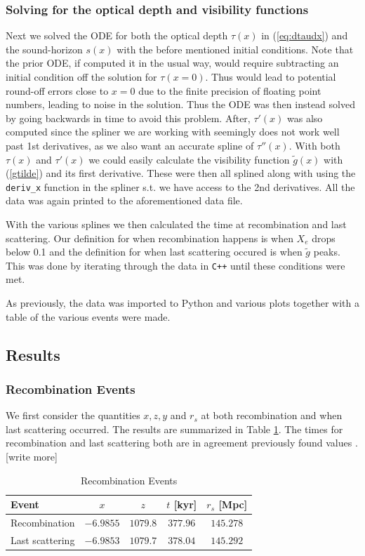 \documentclass[%
reprint,
 amsmath,amssymb,
 aps,
]{revtex4-2}
\begin{document}
\subsubsection{Solving for the optical depth and visibility functions}
Next we solved the ODE for both the optical depth $\tau(x)$ in (\ref{eq:dtaudx}) and the sound-horizon $s(x)$ with the before mentioned initial conditions. Note that the prior ODE, if computed it in the usual way, would require subtracting an initial condition off the solution for $\tau(x=0)$. Thus would lead to potential round-off errors close to $x=0$ due to the finite precision of floating point numbers, leading to noise in the solution. Thus the ODE was then instead solved by going backwards in time to avoid this problem. After, $\tau'(x)$ was also computed since the spliner we are working with seemingly does not work well past 1st derivatives, as we also want an accurate spline of $\tau''(x)$. With both $\tau(x)$ and $\tau'(x)$ we could easily calculate the visibility function $\tilde g(x)$ with (\ref{gtilde}) and its first derivative. These were then all splined along with using the \texttt{deriv\_x} function in the spliner s.t. we have access to the 2nd derivatives. All the data was again printed to the aforementioned data file.

With the various splines we then calculated the time at recombination and last scattering. Our definition for when recombination happens is when $X_e$ drops below 0.1 and the definition for when last scattering occured is when $\tilde g$ peaks. This was done by iterating through the data in \texttt{C++} until these conditions were met.

As previously, the data was imported to Python and various plots together with a table of the various events were made.

\subsection{Results}
\subsubsection{Recombination Events}
We first consider the quantities $x,z,y$ and $r_s$ at both recombination and when last scattering occurred. The results are summarized in Table \ref{tab:recombination_events}. The times for recombination and last scattering both are in agreement previously found values \cite{Planck:2018vyg}. \color{red}[write more]\color{black}
\renewcommand{\arraystretch}{1.25}
\begin{table}[ht!]
	\caption{Recombination Events}
	\label{tab:recombination_events}
	\begin{tabular}{|l|c|c|c|c|}
		\hline
		Event                               & $x$       & $z$      & $t$ [kyr] & $r_s$ [Mpc] \\\hline
		Recombination                & $-6.9855$ & $1079.8$ & $377.96$  & $145.278$   \\\hline
		Last scattering                 & $-6.9853$ & $1079.7$ & $378.04$  & $145.292$   \\\hline
	\end{tabular}
\end{table}
\end{document}
